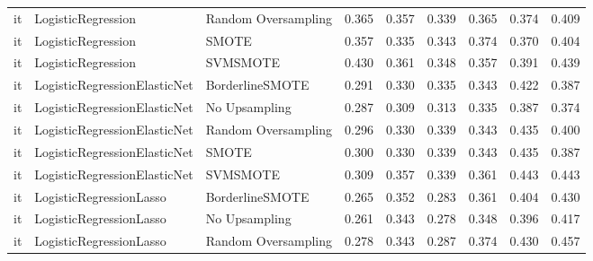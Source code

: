 \begin{tabular}{lllllllll}
      it &              LogisticRegression &           Random Oversampling & 0.365 &                     0.357 &                 0.339 &                  0.365 &                                   0.374 &     0.409 \\
      it &              LogisticRegression &                         SMOTE & 0.357 &                     0.335 &                 0.343 &                  0.374 &                                   0.370 &     0.404 \\
      it &              LogisticRegression &                      SVMSMOTE & 0.430 &                     0.361 &                 0.348 &                  0.357 &                                   0.391 &     0.439 \\
      it &    LogisticRegressionElasticNet &               BorderlineSMOTE & 0.291 &                     0.330 &                 0.335 &                  0.343 &                                   0.422 &     0.387 \\
      it &    LogisticRegressionElasticNet &                 No Upsampling & 0.287 &                     0.309 &                 0.313 &                  0.335 &                                   0.387 &     0.374 \\
      it &    LogisticRegressionElasticNet &           Random Oversampling & 0.296 &                     0.330 &                 0.339 &                  0.343 &                                   0.435 &     0.400 \\
      it &    LogisticRegressionElasticNet &                         SMOTE & 0.300 &                     0.330 &                 0.339 &                  0.343 &                                   0.435 &     0.387 \\
      it &    LogisticRegressionElasticNet &                      SVMSMOTE & 0.309 &                     0.357 &                 0.339 &                  0.361 &                                   0.443 &     0.443 \\
      it &         LogisticRegressionLasso &               BorderlineSMOTE & 0.265 &                     0.352 &                 0.283 &                  0.361 &                                   0.404 &     0.430 \\
      it &         LogisticRegressionLasso &                 No Upsampling & 0.261 &                     0.343 &                 0.278 &                  0.348 &                                   0.396 &     0.417 \\
      it &         LogisticRegressionLasso &           Random Oversampling & 0.278 &                     0.343 &                 0.287 &                  0.374 &                                   0.430 &     0.457 \\

\end{tabular}
